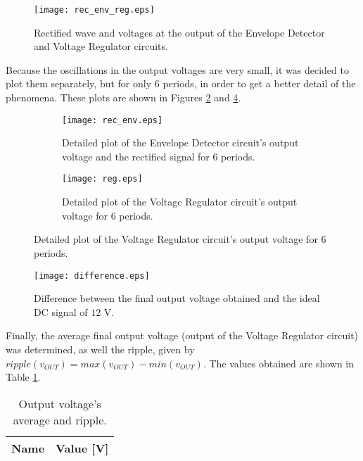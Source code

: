 \begin{figure}[H] \centering
  \texttt{[image: rec\_env\_reg.eps]}
  \caption{Rectified wave and voltages at the output of the Envelope Detector and Voltage Regulator circuits.}
  \label{fig:rectified_envelope_regulator_voltages}
\end{figure}

Because the oscillations in the output voltages are very small, it was decided to plot them separately, but for only 6 periods, in order to get a better detail of the phenomena. These plots are shown in Figures \ref{fig:rectified_envelope_voltage} and \ref{fig:regulator_voltage}.

\begin{figure}[H]
  \begin{subfigure}{.49\linewidth}
    \centering
    \texttt{[image: rec\_env.eps]}
    \footnotesize
    \caption{Detailed plot of the Envelope Detector circuit's output voltage and the rectified signal for 6 periods.}
    \label{fig:rectified_envelope_voltage}
  \end{subfigure}
  \hspace{5mm}
  \begin{subfigure}{.49\linewidth}
    \centering
    \texttt{[image: reg.eps]}  
    \caption{Detailed plot of the Voltage Regulator circuit's output voltage for 6 periods.}
    \label{fig:regulator_voltage}
  \end{subfigure}
\end{figure}

\begin{figure}[H] \centering
  \texttt{[image: difference.eps]}
  \caption{Difference between the final output voltage obtained and the ideal DC signal of $12$ V.}
  \label{fig:difference_from_12V}
\end{figure}

Finally, the average final output voltage (output of the Voltage Regulator circuit) was determined, as well the ripple, given by $ripple(v_{OUT})=max(v_{OUT})-min(v_{OUT})$. The values obtained are shown in Table \ref{tab:theoretical_finalvoltage_ripple}.

\begin{table}[H]
  \centering
  \begin{tabular}{|c|c|}
    \hline    
    {\bf Name} & {\bf Value [V]} \\ \hline
    
  \end{tabular}
  \caption{Output voltage's average and ripple.}
  \label{tab:theoretical_finalvoltage_ripple}
\end{table}
